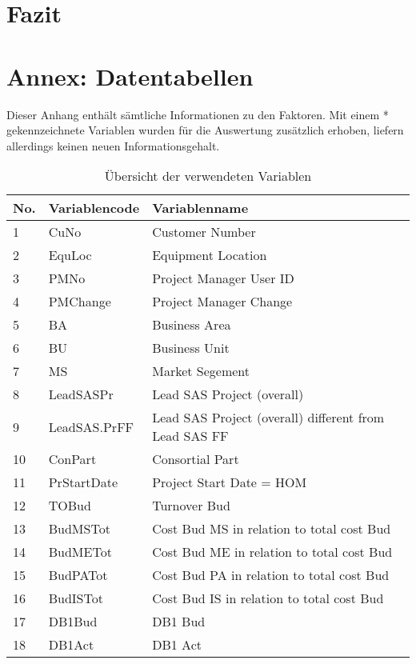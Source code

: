 
\section{Fazit}
\section*{Annex: Datentabellen}\label{sec:annex}
Dieser Anhang enthält sämtliche Informationen zu den Faktoren. Mit einem * gekennzeichnete Variablen wurden für die Auswertung zusätzlich erhoben, liefern allerdings keinen neuen Informationsgehalt.
\begin{longtable}[ht]{p{} p{}p{}}
	\caption{Übersicht der verwendeten Variablen}\\
		\textbf{No.} & \textbf{Variablencode} & \textbf{Variablenname} \\\hline\endhead
    1     & CuNo  & Customer Number \\
2     & EquLoc & Equipment Location \\
3     & PMNo  & Project Manager User ID \\
4     & PMChange & Project Manager Change \\
5     & BA    & Business Area \\
6     & BU    & Business Unit \\
7     & MS    & Market Segement \\
8     & LeadSASPr & Lead SAS Project (overall) \\
9     & LeadSAS.PrFF & Lead SAS Project (overall) different from Lead SAS FF \\
10    & ConPart & Consortial Part \\
11    & PrStartDate & Project Start Date = HOM \\
12    & TOBud & Turnover Bud \\
13    & BudMSTot & Cost Bud MS in relation to total cost Bud \\
14    & BudMETot & Cost Bud ME in relation to total cost Bud  \\
15    & BudPATot & Cost Bud PA in relation to total cost Bud \\
16    & BudISTot & Cost Bud IS in relation to total cost Bud \\
17    & DB1Bud & DB1 Bud \\
18    & DB1Act & DB1 Act \\

\end{longtable}
